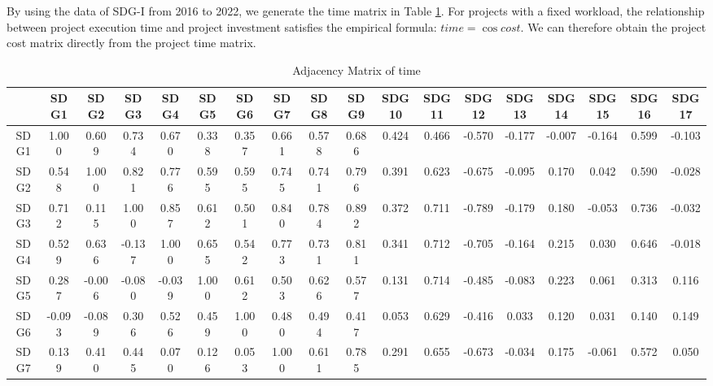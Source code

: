 \documentclass[10pt]{mcmthesis}
\begin{document}
By using the data of SDG-I from 2016 to 2022, we generate the time matrix in Table \ref{tab.time}.
For projects with a fixed workload, the relationship between project execution time and project investment satisfies the empirical formula: $time = \cos{cost}$. We can therefore obtain the project cost matrix directly from the project time matrix.



\begin{table}[h]\caption{ Adjacency Matrix of time }
\tiny
\label{tab.time}
\tabcolsep=0.1cm
\centering
\begin{tabular}{c|ccccccccccccccccc}
\hline
      & SDG1   & SDG2   & SDG3   & SDG4   & SDG5   & SDG6   & SDG7   & SDG8   & SDG9   & SDG10  & SDG11  & SDG12  & SDG13  & SDG14  & SDG15  & SDG16  & SDG17  \\ \hline
SDG1  & 1.000  & 0.609  & 0.734  & 0.670  & 0.338  & 0.357  & 0.661  & 0.578  & 0.686  & 0.424  & 0.466  & -0.570 & -0.177 & -0.007 & -0.164 & 0.599  & -0.103 \\
SDG2  & 0.548  & 1.000  & 0.821  & 0.776  & 0.595  & 0.595  & 0.745  & 0.741  & 0.796  & 0.391  & 0.623  & -0.675 & -0.095 & 0.170  & 0.042  & 0.590  & -0.028 \\
SDG3  & 0.712  & 0.115  & 1.000  & 0.857  & 0.612  & 0.501  & 0.840  & 0.784  & 0.892  & 0.372  & 0.711  & -0.789 & -0.179 & 0.180  & -0.053 & 0.736  & -0.032 \\
SDG4  & 0.529  & 0.636  & -0.137 & 1.000  & 0.655  & 0.542  & 0.773  & 0.731  & 0.811  & 0.341  & 0.712  & -0.705 & -0.164 & 0.215  & 0.030  & 0.646  & -0.018 \\
SDG5  & 0.287  & -0.006 & -0.080 & -0.039 & 1.000  & 0.612  & 0.503  & 0.626  & 0.577  & 0.131  & 0.714  & -0.485 & -0.083 & 0.223  & 0.061  & 0.313  & 0.116  \\
SDG6  & -0.093 & -0.089 & 0.306  & 0.526  & 0.459  & 1.000  & 0.480  & 0.494  & 0.417  & 0.053  & 0.629  & -0.416 & 0.033  & 0.120  & 0.031  & 0.140  & 0.149  \\
SDG7  & 0.139  & 0.410  & 0.445  & 0.070  & 0.126  & 0.053  & 1.000  & 0.611  & 0.785  & 0.291  & 0.655  & -0.673 & -0.034 & 0.175  & -0.061 & 0.572  & 0.050  \\

\end{tabular}
\end{table}
\end{document}
